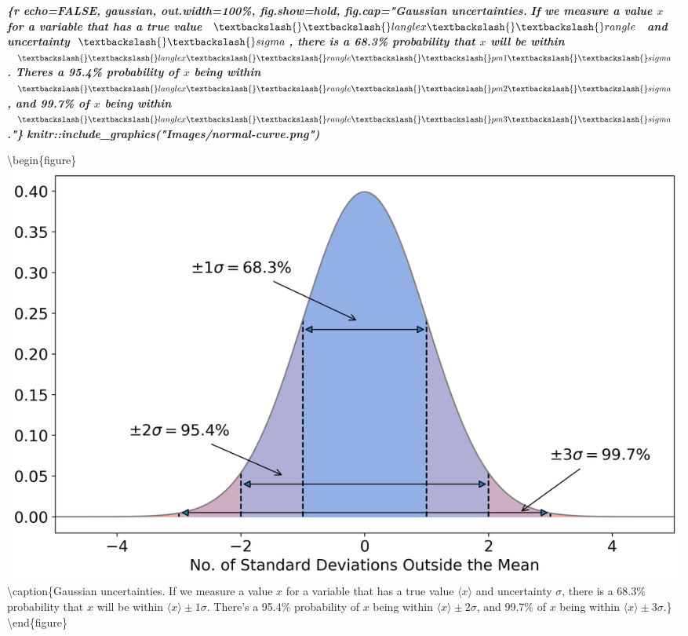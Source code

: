 \documentclass[
]{book}
\newenvironment{Shaded}{\begin{snugshade}}{\end{snugshade}}
\newcommand{\InformationTok}[1]{\textcolor[rgb]{0.56,0.35,0.01}{\textbf{\textit{#1}}}}
\begin{document}
\begin{Shaded}
\begin{Highlighting}[]
\InformationTok{\textasciigrave{}\textasciigrave{}\textasciigrave{}}
\InformationTok{\{r echo=FALSE, gaussian, out.width=\textquotesingle{}100\%\textquotesingle{}, fig.show=\textquotesingle{}hold\textquotesingle{}, fig.cap="Gaussian uncertainties. }
\InformationTok{If we measure a value $x$ for a variable that has a true value $\textbackslash{}\textbackslash{}langle x \textbackslash{}\textbackslash{}rangle$ and}
\InformationTok{uncertainty $\textbackslash{}\textbackslash{}sigma$, there is a 68.3\% probability that $x$ will be within }
\InformationTok{$\textbackslash{}\textbackslash{}langle x \textbackslash{}\textbackslash{}rangle \textbackslash{}\textbackslash{}pm 1\textbackslash{}\textbackslash{}sigma$. There\textquotesingle{}s a 95.4\% probability of $x$ being within }
\InformationTok{$\textbackslash{}\textbackslash{}langle x \textbackslash{}\textbackslash{}rangle \textbackslash{}\textbackslash{}pm 2\textbackslash{}\textbackslash{}sigma$, and 99.7\% of $x$ being within  }
\InformationTok{$\textbackslash{}\textbackslash{}langle x \textbackslash{}\textbackslash{}rangle \textbackslash{}\textbackslash{}pm 3\textbackslash{}\textbackslash{}sigma$."\}}
\InformationTok{knitr::include\_graphics("Images/normal{-}curve.png")}
\InformationTok{\textasciigrave{}\textasciigrave{}\textasciigrave{}}
\end{Highlighting}
\end{Shaded}

\textbackslash begin\{figure\}
\includegraphics[width=1\linewidth]{Images/normal-curve} \textbackslash caption\{Gaussian uncertainties. If we measure a value \(x\) for a variable that has a true value \(\langle x \rangle\) and uncertainty \(\sigma\), there is a 68.3\% probability that \(x\) will be within \(\langle x \rangle \pm 1\sigma\). There's a 95.4\% probability of \(x\) being within \(\langle x \rangle \pm 2\sigma\), and 99.7\% of \(x\) being within \(\langle x \rangle \pm 3\sigma\).\}\label{fig:gaussian}
\textbackslash end\{figure\}
\end{document}
